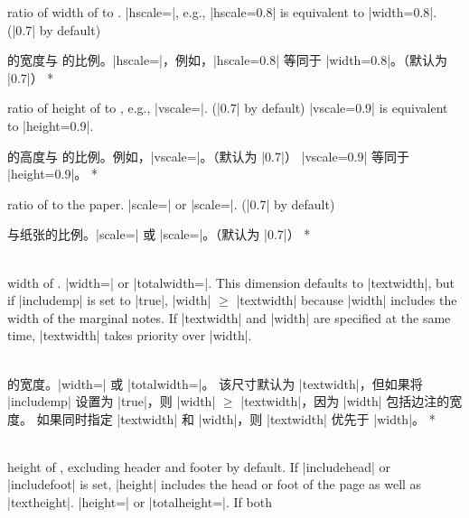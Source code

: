\begin{Options}
\begin{paracol}{2}
\item[hscale]
ratio of width of  to . 
|hscale=|, e.g., |hscale=0.8| is equivalent to
|width=0.8|. (|0.7| by default)
\switchcolumn
\item[hscale] 的宽度与  的比例。|hscale=|，例如，|hscale=0.8| 等同于 |width=0.8|。（默认为 |0.7|）   
   \switchcolumn[0]*   
\item[vscale]
   ratio of height of  to , e.g.,
   |vscale=|. (|0.7| by default) |vscale=0.9| is equivalent
   to |height=0.9|.
\switchcolumn
\item[vscale] 的高度与  的比例。例如，|vscale=|。（默认为 |0.7|）
|vscale=0.9| 等同于 |height=0.9|。
\switchcolumn[0]*
\item[scale] ratio of  to the paper.
   |scale=| or |scale=|.
   (|0.7| by default)
\switchcolumn
\item[scale] 与纸张的比例。|scale=| 或 |scale=|。（默认为 |0.7|）
\switchcolumn[0]*
\item[width\OR totalwidth] ~\\
width of . |width=| or
|totalwidth=|. This dimension defaults to |textwidth|,
but if |includemp| is set to |true|, |width| $\ge$ |textwidth| 
because |width| includes the width of the marginal notes.
If |textwidth| and |width| are specified at the same time, 
|textwidth| takes priority over |width|.
\switchcolumn
\item[width\OR totalwidth] ~\\
的宽度。|width=| 或 |totalwidth=|。
该尺寸默认为 |textwidth|，但如果将 |includemp| 设置为 |true|，则 |width| $\ge$ |textwidth|，因为 |width| 包括边注的宽度。
如果同时指定 |textwidth| 和 |width|，则 |textwidth| 优先于 |width|。
\switchcolumn[0]*
\item[height\OR totalheight] ~\\
height of , excluding header and footer by default.
If |includehead| or |includefoot| is set, |height| includes
the head or foot of the page as well as |textheight|.
|height=| or |totalheight=|. If both

\end{paracol}
\end{Options}
